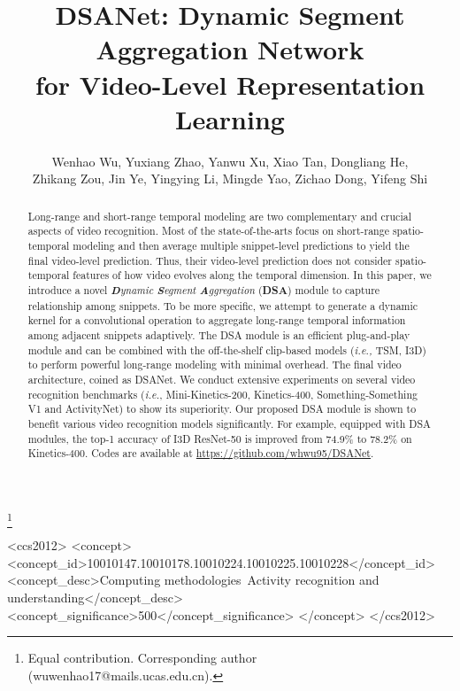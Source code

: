 \documentclass[sigconf]{acmart}
\begin{document}
\fancyhead{}
\title{DSANet: Dynamic Segment Aggregation Network \\ for Video-Level Representation Learning}

\thanks{ Equal contribution.  Corresponding author (wuwenhao17@mails.ucas.edu.cn).}

\author{
    Wenhao Wu,
    Yuxiang Zhao,
    Yanwu Xu, 
    Xiao Tan,
    Dongliang He, \\
    Zhikang Zou,
    Jin Ye,
    Yingying Li,
    Mingde Yao,
    Zichao Dong,
    Yifeng Shi 
}




\begin{abstract}
Long-range and short-range temporal modeling are two complementary and crucial aspects of video recognition. 
Most of the state-of-the-arts focus on short-range spatio-temporal modeling and then average multiple snippet-level predictions to yield the final video-level prediction. 
Thus, their video-level prediction does not consider spatio-temporal features of how video evolves along the temporal dimension.
In this paper, we introduce a novel \emph{\textbf{D}ynamic \textbf{S}egment \textbf{A}ggregation} (\textbf{DSA}) module to capture relationship among snippets.  
To be more specific, we attempt to generate a dynamic kernel for a convolutional operation to aggregate long-range temporal information among adjacent snippets adaptively. 
The DSA module is an efficient plug-and-play module and can be combined with the off-the-shelf clip-based models (\emph{i.e.,} TSM, I3D) to perform powerful long-range modeling with minimal overhead.
The final video architecture, coined as DSANet.
We conduct extensive experiments on several video recognition benchmarks (\emph{i.e.}, Mini-Kinetics-200, Kinetics-400, Something-Something V1 and ActivityNet) to show its superiority. 
Our proposed DSA module is shown to benefit various video recognition models significantly. For example, equipped with DSA modules, the top-1 accuracy of I3D ResNet-50 is improved from 74.9\% to 78.2\% on Kinetics-400.
Codes are available at \url{https://github.com/whwu95/DSANet}.
\end{abstract}

\begin{CCSXML}
<ccs2012>
   <concept>
       <concept_id>10010147.10010178.10010224.10010225.10010228</concept_id>
       <concept_desc>Computing methodologies~Activity recognition and understanding</concept_desc>
       <concept_significance>500</concept_significance>
       </concept>
 </ccs2012>
\end{CCSXML}
\end{document}
